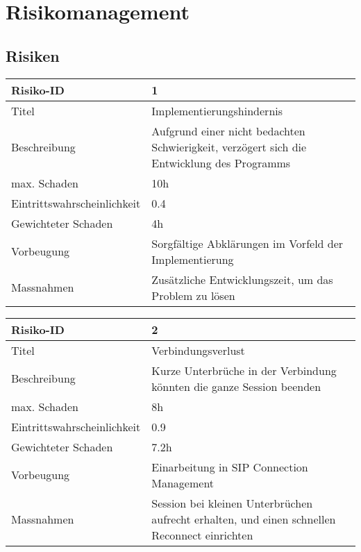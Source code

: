 \chapter{Risikomanagement}
\label{risiken} 
\section{Risiken}

\noindent
\begin{tabular}{|p{} | p{} |}
	\hline	
	Risiko-ID & 1 \\
	\hline
	Titel & Implementierungshindernis \\
	Beschreibung & Aufgrund einer nicht bedachten Schwierigkeit, verzögert sich die Entwicklung des Programms \\
	max. Schaden	& 10h \\
	Eintrittswahrscheinlichkeit & 0.4 \\
	Gewichteter Schaden	& 4h \\
	Vorbeugung	& Sorgfältige Abklärungen im Vorfeld der Implementierung \\
	Massnahmen	& Zusätzliche Entwicklungszeit, um das Problem zu lösen \\
	\hline
\end{tabular}
\hspace{0.5cm}
\newline

\noindent
\begin{tabular}{|p{} | p{} |}
	\hline	
	Risiko-ID & 2 \\
	\hline
	Titel & Verbindungsverlust \\
	Beschreibung & Kurze Unterbrüche in der Verbindung könnten die ganze Session beenden \\
	max. Schaden	& 8h \\
	Eintrittswahrscheinlichkeit & 0.9 \\
	Gewichteter Schaden	& 7.2h \\
	Vorbeugung	& Einarbeitung in SIP Connection Management \\
	Massnahmen	& Session bei kleinen Unterbrüchen aufrecht erhalten, und einen schnellen Reconnect einrichten \\
	\hline
\end{tabular}
\hspace{0.5cm}
\newline
	
